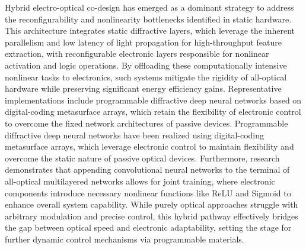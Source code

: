 Hybrid electro-optical co-design has emerged as a dominant strategy to address the reconfigurability and nonlinearity bottlenecks identified in static hardware. This architecture integrates static diffractive layers, which leverage the inherent parallelism and low latency of light propagation for high-throughput feature extraction, with reconfigurable electronic layers responsible for nonlinear activation and logic operations. By offloading these computationally intensive nonlinear tasks to electronics, such systems mitigate the rigidity of all-optical hardware while preserving significant energy efficiency gains. Representative implementations include programmable diffractive deep neural networks based on digital-coding metasurface arrays, which retain the flexibility of electronic control to overcome the fixed network architectures of passive devices. Programmable diffractive deep neural networks have been realized using digital-coding metasurface arrays, which leverage electronic control to maintain flexibility and overcome the static nature of passive optical devices. \citep{doi_10_1038_s41928_022_00719_9_a2169947} Furthermore, research demonstrates that appending convolutional neural networks to the terminal of all-optical multilayered networks allows for joint training, where electronic components introduce necessary nonlinear functions like ReLU and Sigmoid to enhance overall system capability. While purely optical approaches struggle with arbitrary modulation and precise control, this hybrid pathway effectively bridges the gap between optical speed and electronic adaptability, setting the stage for further dynamic control mechanisms via programmable materials. \citep{doi_10_3390_nano14221812_4d7d91b1} \citep{doi_10_1038_s41928_022_00719_9_a2169947} \citep{doi_10_1126_sciadv_adu0904_786138ff}

